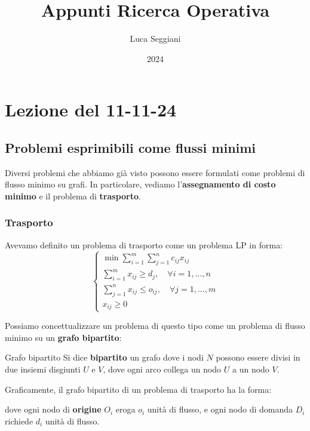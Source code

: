 \documentclass[a4paper,11pt]{article}
\title{Appunti Ricerca Operativa}
\author{Luca Seggiani}
\date{2024}
\begin{document}
\section{Lezione del 11-11-24}

\thispagestyle{empty}
\pagestyle{fancy}

\subsection{Problemi esprimibili come flussi minimi}
Diversi problemi che abbiamo già visto possono essere formulati come problemi di flusso minimo su grafi.
In particolare, vediamo l'\textbf{assegnamento di costo minimo} e il problema di \textbf{trasporto}.

\subsubsection{Trasporto}
Avevamo definito un problema di trasporto come un problema LP in forma:
\[
	\begin{cases}
		\min \sum_{i=1}^m \sum_{j=1}^n c_{ij} x_{ij} \\ 
		\sum_{i=1}^m x_{ij} \geq d_{j}, \quad \forall i = 1, ..., n \\ 
		\sum_{j=1}^n x_{ij} \leq o_{ij}, \quad \forall j = 1, ..., m \\
		x_{ij} \geq 0
	\end{cases}
\]

Possiamo concettualizzare un problema di questo tipo come un problema di flusso minimo su un \textbf{grafo bipartito}:
\begin{definition}{Grafo bipartito}
	Si dice \textbf{bipartito} un grafo dove i nodi $N$ possono essere divisi in due insiemi disgiunti $U$ e $V$, dove ogni arco collega un nodo $U$ a un nodo $V$.
\end{definition}

Graficamente, il grafo bipartito di un problema di trasporto ha la forma:
\begin{center}
\end{center}
dove ogni nodo di \textbf{origine} $O_i$ eroga $o_i$ unità di flusso, e ogni nodo di domanda $D_i$ richiede $d_i$ unità di flusso.
\end{document}
